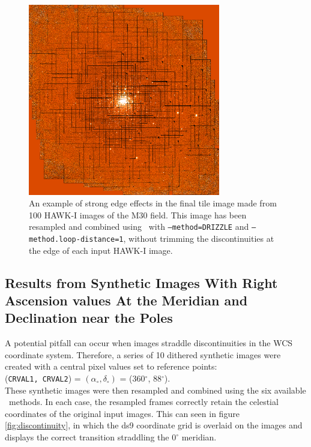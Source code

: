 \begin{figure}[H]
\centering
\includegraphics[width=8.4cm]{figures/hdrldemo_resample_DRIZZLE_HAWKI_M30_3.png}
\caption[]
	{\footnotesize  An example of strong edge effects in the final tile image made from 100 HAWK-I images of the M30 field.
	This image has been resampled and combined using \hdrlresample\ with {\tt --method=DRIZZLE} and {\tt --method.loop-distance=1}, 
	without trimming the discontinuities at the edge of each input HAWK-I image.\\
	}
	\label{fig:hawki_edges}
\end{figure}




\subsection{Results from Synthetic Images With Right Ascension values At the Meridian and Declination near the Poles}

A potential pitfall can occur when images straddle discontinuities in the WCS coordinate system.  Therefore, a series of 10 dithered synthetic images were created
with a central pixel values set to reference points:\\
({\tt CRVAL1, CRVAL2}) = $(\alpha_{\circ}, \delta_{\circ})$ = (360$^\circ$, 88$^\circ$). \\
These synthetic images were then resampled and combined using the six available \hdrlresample\ methods.   In each case, the resampled frames correctly retain the
celestial coordinates of the original input images.   This can seen in figure \ref{fig:discontinuity}, in which the ds9 coordinate grid is overlaid on the images and displays
the correct transition straddling the $0^\circ$ meridian.


